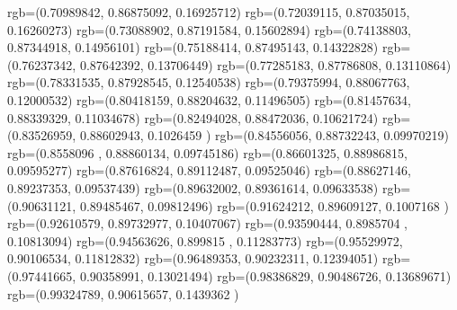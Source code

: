{{{			rgb=(0.70989842,  0.86875092,  0.16925712)
			rgb=(0.72039115,  0.87035015,  0.16260273)
			rgb=(0.73088902,  0.87191584,  0.15602894)
			rgb=(0.74138803,  0.87344918,  0.14956101)
			rgb=(0.75188414,  0.87495143,  0.14322828)
			rgb=(0.76237342,  0.87642392,  0.13706449)
			rgb=(0.77285183,  0.87786808,  0.13110864)
			rgb=(0.78331535,  0.87928545,  0.12540538)
			rgb=(0.79375994,  0.88067763,  0.12000532)
			rgb=(0.80418159,  0.88204632,  0.11496505)
			rgb=(0.81457634,  0.88339329,  0.11034678)
			rgb=(0.82494028,  0.88472036,  0.10621724)
			rgb=(0.83526959,  0.88602943,  0.1026459 )
			rgb=(0.84556056,  0.88732243,  0.09970219)
			rgb=(0.8558096 ,  0.88860134,  0.09745186)
			rgb=(0.86601325,  0.88986815,  0.09595277)
			rgb=(0.87616824,  0.89112487,  0.09525046)
			rgb=(0.88627146,  0.89237353,  0.09537439)
			rgb=(0.89632002,  0.89361614,  0.09633538)
			rgb=(0.90631121,  0.89485467,  0.09812496)
			rgb=(0.91624212,  0.89609127,  0.1007168 )
			rgb=(0.92610579,  0.89732977,  0.10407067)
			rgb=(0.93590444,  0.8985704 ,  0.10813094)
			rgb=(0.94563626,  0.899815  ,  0.11283773)
			rgb=(0.95529972,  0.90106534,  0.11812832)
			rgb=(0.96489353,  0.90232311,  0.12394051)
			rgb=(0.97441665,  0.90358991,  0.13021494)
			rgb=(0.98386829,  0.90486726,  0.13689671)
			rgb=(0.99324789,  0.90615657,  0.1439362 )
		}
	}
}


\usepackage{braket}
\usepackage{amsmath}
\usepackage[thinc]{esdiff}

\usepackage{graphicx, color}
\usepackage{subcaption}
\usepackage{tikz}
\usetikzlibrary{arrows}
\usetikzlibrary{calc}
\usepackage{wasysym}
\usepackage{gensymb}
\usepackage[toc]{appendix}
\usepackage{intcalc}



\iffalse
{}



